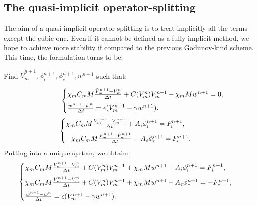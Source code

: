 \documentclass[a4paper,11pt]{article}
\begin{document}
\subsection{The quasi-implicit operator-splitting}
The aim of a quasi-implicit operator splitting is to treat implicitly all the terms except the cubic one. Even if it cannot be defined as a fully implicit method, we hope to achieve more stability if compared to the previous Godunov-kind scheme. This time, the formulation turns to be: \newline

\begin{center} Find $\tilde{V}_m^{n+1}, \phi_i^{n+1}, \phi_e^{n+1},w^{n+1}$ such that: \end{center}
\begin{equation*} \hspace{17mm}
\begin{cases}
\chi_m C_m M \frac{\tilde{V}_m^{n+1}-V_m^n}{\Delta t} +  C(V_m^n) V_m^{n+1} + \chi_m M w^{n+1}= 0,\vspace{2mm}\\
\frac{w^{n+1} - w^n}{\Delta t} = \epsilon (V_m^{n+1}-\gamma w^{n+1}).
\end{cases}
\end{equation*}
\vspace{3mm}
\begin{equation*}
\begin{cases}
\chi_m C_m M \frac{V_m^{n+1}-\tilde{V}_m^{n+1}}{\Delta t} + A_i \phi_i^{n+1}= F_i^{n+1},\vspace{2mm}\\
- \chi_m C_m M \frac{V_m^{n+1}-\tilde{V}_m^{n+1}}{\Delta t} + A_e \phi_e^{n+1}= F_e^{n+1}.
\end{cases}
\end{equation*}
\vspace{3mm}
Putting into a unique system, we obtain:
\begin{equation}\label{Quasi}
\begin{cases}
\chi_m C_m M \frac{V_m^{n+1}-V_m^{n}}{\Delta t} + C(V_m^n) V_m^{n+1} + \chi_m M w^{n+1} + A_i \phi_i ^{n+1} = F_i^{n+1}, \vspace{2mm}\\
\chi_m C_m M \frac{V_m^{n+1}-V_m^{n}}{\Delta t} +  C(V_m^n) V_m^{n+1} + \chi_m M w^{n+1} - A_e \phi_e ^{n+1} =  -F_e^{n+1},\vspace{2mm} \\
\frac{w^{n+1}-w^{n}}{\Delta t} = \epsilon(V_m^{n+1}-\gamma w^{n+1}).
\end{cases}
\end{equation} 
\end{document}
